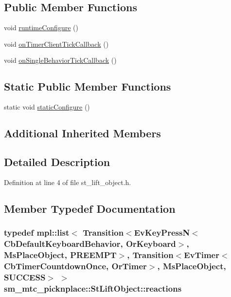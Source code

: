 \subsection*{Public Member Functions}
\begin{DoxyCompactItemize}
\item 
void \hyperlink{structsm__mtc__picknplace_1_1StLiftObject_a6485b79496fbde83944bb5a6f96403f4}{runtime\+Configure} ()
\item 
void \hyperlink{structsm__mtc__picknplace_1_1StLiftObject_ae60a55b71a362721f22d867809928b26}{on\+Timer\+Client\+Tick\+Callback} ()
\item 
void \hyperlink{structsm__mtc__picknplace_1_1StLiftObject_a4dff1ab1c520be6fb40b7c3f783a4e84}{on\+Single\+Behavior\+Tick\+Callback} ()
\end{DoxyCompactItemize}
\subsection*{Static Public Member Functions}
\begin{DoxyCompactItemize}
\item 
static void \hyperlink{structsm__mtc__picknplace_1_1StLiftObject_add7985f5960343fa7f3a3c9d06eaf849}{static\+Configure} ()
\end{DoxyCompactItemize}
\subsection*{Additional Inherited Members}


\subsection{Detailed Description}


Definition at line 4 of file st\+\_\+lift\+\_\+object.\+h.



\subsection{Member Typedef Documentation}
\subsubsection[{\texorpdfstring{reactions}{reactions}}]{\setlength{\rightskip}{0pt plus 5cm}typedef mpl\+::list$<$ Transition$<$Ev\+Key\+PressN$<$Cb\+Default\+Keyboard\+Behavior, {\bf Or\+Keyboard}$>$, {\bf Ms\+Place\+Object}, {\bf P\+R\+E\+E\+M\+PT}$>$, Transition$<$Ev\+Timer$<$Cb\+Timer\+Countdown\+Once, {\bf Or\+Timer}$>$, {\bf Ms\+Place\+Object}, {\bf S\+U\+C\+C\+E\+SS}$>$ $>$ {\bf sm\+\_\+mtc\+\_\+picknplace\+::\+St\+Lift\+Object\+::reactions}}\hypertarget{structsm__mtc__picknplace_1_1StLiftObject_ab3f702777b8da45968441785b96174ff}{}\label{structsm__mtc__picknplace_1_1StLiftObject_ab3f702777b8da45968441785b96174ff}


